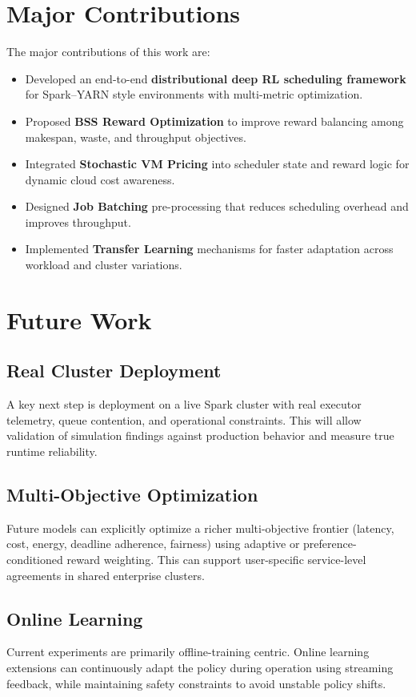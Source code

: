 \section{Major Contributions}
The major contributions of this work are:
\begin{itemize}
    \item Developed an end-to-end \textbf{distributional deep RL scheduling framework} for Spark--YARN style environments with multi-metric optimization.
    \item Proposed \textbf{BSS Reward Optimization} to improve reward balancing among makespan, waste, and throughput objectives.
    \item Integrated \textbf{Stochastic VM Pricing} into scheduler state and reward logic for dynamic cloud cost awareness.
    \item Designed \textbf{Job Batching} pre-processing that reduces scheduling overhead and improves throughput.
    \item Implemented \textbf{Transfer Learning} mechanisms for faster adaptation across workload and cluster variations.
\end{itemize}

\section{Future Work}
\subsection{Real Cluster Deployment}
A key next step is deployment on a live Spark cluster with real executor telemetry, queue contention, and operational constraints. This will allow validation of simulation findings against production behavior and measure true runtime reliability.

\subsection{Multi-Objective Optimization}
Future models can explicitly optimize a richer multi-objective frontier (latency, cost, energy, deadline adherence, fairness) using adaptive or preference-conditioned reward weighting. This can support user-specific service-level agreements in shared enterprise clusters.

\subsection{Online Learning}
Current experiments are primarily offline-training centric. Online learning extensions can continuously adapt the policy during operation using streaming feedback, while maintaining safety constraints to avoid unstable policy shifts.

